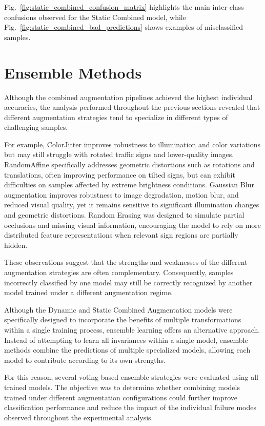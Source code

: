 \documentclass[conference]{IEEEtran}
\begin{document}
Fig.~\ref{fig:static_combined_confusion_matrix} highlights the main inter-class confusions observed for the Static Combined model, while Fig.~\ref{fig:static_combined_bad_predictions} shows examples of misclassified samples.










\section{Ensemble Methods}

Although the combined augmentation pipelines achieved the highest individual accuracies, the analysis performed throughout the previous sections revealed that different augmentation strategies tend to specialize in different types of challenging samples.

For example, ColorJitter improves robustness to illumination and color variations but may still struggle with rotated traffic signs and lower-quality images. RandomAffine specifically addresses geometric distortions such as rotations and translations, often improving performance on tilted signs, but can exhibit difficulties on samples affected by extreme brightness conditions. Gaussian Blur augmentation improves robustness to image degradation, motion blur, and reduced visual quality, yet it remains sensitive to significant illumination changes and geometric distortions. Random Erasing was designed to simulate partial occlusions and missing visual information, encouraging the model to rely on more distributed feature representations when relevant sign regions are partially hidden.

These observations suggest that the strengths and weaknesses of the different augmentation strategies are often complementary. Consequently, samples incorrectly classified by one model may still be correctly recognized by another model trained under a different augmentation regime.

Although the Dynamic and Static Combined Augmentation models were specifically designed to incorporate the benefits of multiple transformations within a single training process, ensemble learning offers an alternative approach. Instead of attempting to learn all invariances within a single model, ensemble methods combine the predictions of multiple specialized models, allowing each model to contribute according to its own strengths.

For this reason, several voting-based ensemble strategies were evaluated using all trained models. The objective was to determine whether combining models trained under different augmentation configurations could further improve classification performance and reduce the impact of the individual failure modes observed throughout the experimental analysis.
\end{document}
